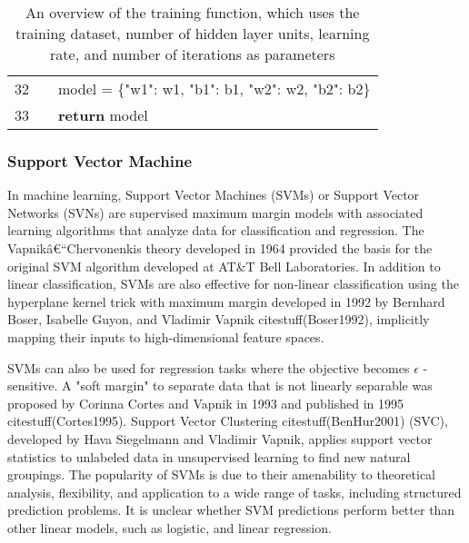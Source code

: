 \documentclass[preprint,12pt]{elsarticle}
\begin{document}
\begin{table}[ht]
{\begin{tabular}{|r l l l l|}
            \rowcolor{regularback} \cellcolor{linenumberback} \textcolor{grayhighlight}{32} & & \multicolumn{3}{l|}{model \textcolor{grayhighlight}{=} \{\textcolor{codered}{"w1"}: w1, \textcolor{codered}{"b1"}: b1, \textcolor{codered}{"w2"}: w2, \textcolor{codered}{"b2"}: b2\}} \\
            \rowcolor{regularback} \cellcolor{linenumberback} \textcolor{grayhighlight}{33} & & \multicolumn{3}{l|}{\textcolor{codegreen}{\textbf{return}} model} \\
            \hline
        \end{tabular}
    }
    \caption{An overview of the training function, which uses the training dataset, number of hidden layer units, learning rate, and number of iterations as parameters}
    \label{tab:train}
\end{table}

\subsubsection{Support Vector Machine}

In machine learning, Support Vector Machines (SVMs) or Support Vector Networks (SVNs) are supervised maximum margin models with associated learning algorithms that analyze data for classification and regression. The Vapnikâ€“Chervonenkis theory developed in 1964 provided the basis for the original SVM algorithm developed at AT\&T Bell Laboratories. In addition to linear classification, SVMs are also effective for non-linear classification using the hyperplane kernel trick with maximum margin developed in 1992 by Bernhard Boser, Isabelle Guyon, and Vladimir Vapnik citestuff(Boser1992), implicitly mapping their inputs to high-dimensional feature spaces. 

SVMs can also be used for regression tasks where the objective becomes $\epsilon$ -sensitive. A "soft margin" to separate data that is not linearly separable was proposed by Corinna Cortes and Vapnik in 1993 and published in 1995 citestuff(Cortes1995). Support Vector Clustering citestuff(BenHur2001) (SVC), developed by Hava Siegelmann and Vladimir Vapnik, applies support vector statistics to unlabeled data in unsupervised learning to find new natural groupings. The popularity of SVMs is due to their amenability to theoretical analysis, flexibility, and application to a wide range of tasks, including structured prediction problems. It is unclear whether SVM predictions perform better than other linear models, such as logistic, and linear regression.
\end{document}
